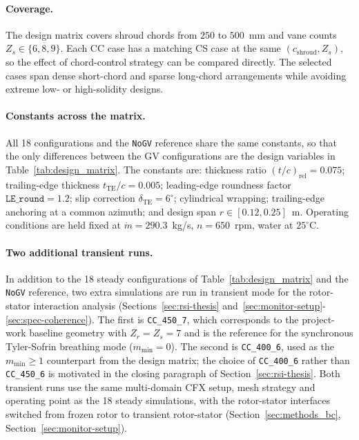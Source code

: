 \paragraph{Coverage.}
The design matrix covers shroud chords from $250$ to $500$~mm and vane counts $Z_s \in \{6,8,9\}$. Each CC case has a matching CS case at the same $(c_{\mathrm{shroud}}, Z_s)$, so the effect of chord-control strategy can be compared directly. The selected cases span dense short-chord and sparse long-chord arrangements while avoiding extreme low- or high-solidity designs.

\paragraph{Constants across the matrix.}
All 18 configurations and the \texttt{NoGV} reference share the same constants, so that the only differences between the GV configurations are the design variables in Table~\ref{tab:design_matrix}. The constants are: thickness ratio $(t/c)_{\mathrm{rel}} = 0.075$; trailing-edge thickness $t_{\mathrm{TE}}/c = 0.005$; leading-edge roundness factor $\texttt{LE\_round} = 1.2$; slip correction $\delta_{\mathrm{TE}} = 6^\circ$; cylindrical wrapping; trailing-edge anchoring at a common azimuth; and design span $r \in [0.12, 0.25]$~m. Operating conditions are held fixed at $\dot m = 290.3$~kg/s, $n = 650$~rpm, water at $25^\circ$C.

\paragraph{Two additional transient runs.}
In addition to the 18 steady configurations of Table~\ref{tab:design_matrix} and the \texttt{NoGV} reference, two extra simulations are run in transient mode for the rotor-stator interaction analysis (Sections~\ref{sec:rsi-thesis} and~\ref{sec:monitor-setup}-\ref{sec:spec-coherence}). The first is \texttt{CC\_450\_7}, which corresponds to the project-work baseline geometry with $Z_r=Z_s=7$ and is the reference for the synchronous Tyler-Sofrin breathing mode ($m_{\min}=0$). The second is \texttt{CC\_400\_6}, used as the $m_{\min}\geq 1$ counterpart from the design matrix; the choice of \texttt{CC\_400\_6} rather than \texttt{CC\_450\_6} is motivated in the closing paragraph of Section~\ref{sec:rsi-thesis}. Both transient runs use the same multi-domain CFX setup, mesh strategy and operating point as the 18 steady simulations, with the rotor-stator interfaces switched from frozen rotor to transient rotor-stator (Section~\ref{sec:methods_bc}, Section~\ref{sec:monitor-setup}).

